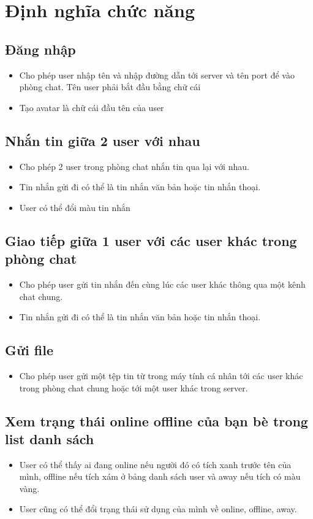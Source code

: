 \documentclass[a4paper]{article}
\begin{document}
\newpage
\tableofcontents
\newpage
\listoffigures
\newpage

\section{Định nghĩa chức năng}
	\subsection{Đăng nhập}
	\begin{itemize}
		\item Cho phép user nhập tên và nhập đường dẫn tới server và tên port để vào phòng chat. Tên user phải bắt đầu bằng chữ cái
		\item Tạo avatar là chữ cái đầu tên của user
	\end{itemize}
	\subsection{Nhắn tin giữa 2 user với nhau}
	\begin{itemize}
		\item Cho phép 2 user trong phòng chat nhắn tin qua lại với nhau.
		\item Tin nhắn gửi đi có thể là tin nhắn văn bản hoặc tin nhắn thoại.
		\item User có thể đổi màu tin nhắn
	\end{itemize}
	\subsection{Giao tiếp giữa 1 user với các user khác trong phòng chat}
	\begin{itemize}
		\item Cho phép user gửi tin nhắn đến cùng lúc các user khác thông qua một kênh chat chung.
		\item Tin nhắn gửi đi có thể là tin nhắn văn bản hoặc tin nhắn thoại.
	\end{itemize}
	\subsection{Gửi file}
	\begin{itemize}
		\item Cho phép user gửi một tệp tin từ trong máy tính cá nhân tới các user khác trong phòng chat chung hoặc tới một user khác trong server.
	\end{itemize}
	\subsection{Xem trạng thái online offline của bạn bè trong list danh sách}
	\begin{itemize}
		\item User có thể thấy ai đang online nếu người đó có tích xanh trước tên của mình, offline nếu tích xám ở bảng danh sách user và away nếu tích có màu vàng.
		\item User cũng có thể đổi trạng thái sử dụng của mình về online, offline, away.
	\end{itemize}
\end{document}

